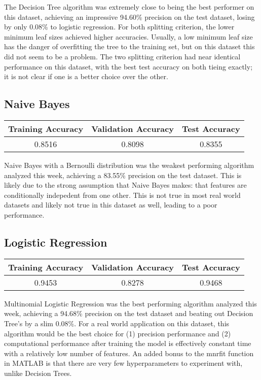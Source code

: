 \documentclass[12pt]{article}
\begin{document}
The Decision Tree algorithm was extremely close to being the best performer on this dataset, achieving an impressive 94.60\% precision on the test dataset, losing by only 0.08\% to logistic regression. For both splitting criterion, the lower minimum leaf sizes achieved higher accuracies. Usually, a low minimum leaf size has the danger of overfitting the tree to the training set, but on this dataset this did not seem to be a problem. The two splitting criterion had near identical performance on this dataset, with the best test accuracy on both tieing exactly; it is not clear if one is a better choice over the other.

\subsection{Naive Bayes}
\begin{center}
    \begin{tabular}{| c | c | c |} 
    \hline
    Training Accuracy & Validation Accuracy & Test Accuracy \\ 
	\hline \hline
	0.8516 & 0.8098 & 0.8355 \\
	\hline
    \end{tabular}
\end{center}

Naive Bayes with a Bernoulli distribution was the weakest performing algorithm analyzed this week, achieving a 83.55\% precision on the test dataset. This is likely due to the strong assumption that Naive Bayes makes: that features are conditionally indepedent from one other. This is not true in most real world datasets and likely not true in this dataset as well, leading to a poor performance.

\subsection{Logistic Regression}
\begin{center}
    \begin{tabular}{| c | c | c |} 
    \hline
    Training Accuracy & Validation Accuracy & Test Accuracy \\ 
	\hline \hline
	0.9453 & 0.8278 & 0.9468 \\
	\hline
    \end{tabular}
\end{center}

Multinomial Logistic Regression was the best performing algorithm analyzed this week, achieving a 94.68\% precision on the test dataset and beating out Decision Tree's by a slim 0.08\%. For a real world application on this dataset, this algorithm would be the best choice for (1) precision performance and (2) computational performance after training the model is effectively constant time with a relatively low number of features. An added bonus to the mnrfit function in MATLAB is that there are very few hyperparameters to experiment with, unlike Decision Trees.
\end{document}
